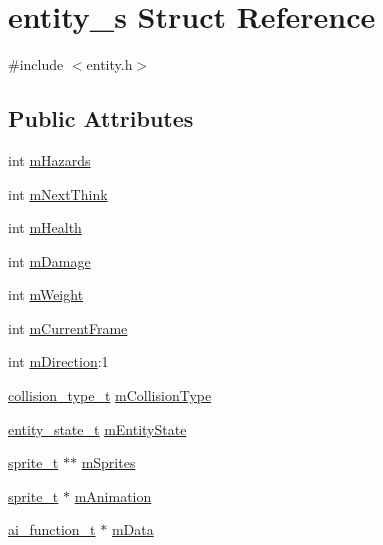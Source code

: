 \hypertarget{structentity__s}{}\section{entity\+\_\+s Struct Reference}
\label{structentity__s}


{\ttfamily \#include $<$entity.\+h$>$}

\subsection*{Public Attributes}
\begin{DoxyCompactItemize}
\item 
int \hyperlink{structentity__s_a85aba3f3deb7126edc63842086839c79}{m\+Hazards}
\item 
int \hyperlink{structentity__s_a760363fc97f98abe86919af5e1957745}{m\+Next\+Think}
\item 
int \hyperlink{structentity__s_a4526f4ec298fe048fb0394eb1eada6c2}{m\+Health}
\item 
int \hyperlink{structentity__s_aa0f5af86981e724016b355cf4848e0e7}{m\+Damage}
\item 
int \hyperlink{structentity__s_ac2067b7ab37cc1f70d5e8353755109fa}{m\+Weight}
\item 
int \hyperlink{structentity__s_ada34ca9a8b88e0f09d9db8d326f3a4be}{m\+Current\+Frame}
\item 
int \hyperlink{structentity__s_a1c2e6077665e194128d01c8789f76941}{m\+Direction}\+:1
\item 
\hyperlink{globals_8h_a09e75d7e17aa0fd73648231363dcc13a}{collision\+\_\+type\+\_\+t} \hyperlink{structentity__s_aff6d73a9efeac0929da697cde607a8bc}{m\+Collision\+Type}
\item 
\hyperlink{globals_8h_a99f3d33a52ee74fc145c14ceee9d4154}{entity\+\_\+state\+\_\+t} \hyperlink{structentity__s_a4636f280b32796ffb0d647e1ce72898e}{m\+Entity\+State}
\item 
\hyperlink{graphics_8h_a5371414b10358aeda7c6bcec8196342f}{sprite\+\_\+t} $\ast$$\ast$ \hyperlink{structentity__s_a559fa151dfaeab03a371853042d4b22f}{m\+Sprites}
\item 
\hyperlink{graphics_8h_a5371414b10358aeda7c6bcec8196342f}{sprite\+\_\+t} $\ast$ \hyperlink{structentity__s_ad464763e1aa713bd82f953fb139810c1}{m\+Animation}
\item 
\hyperlink{ai__interpret_8h_a93e23f66130135adeb83b13c29f36fca}{ai\+\_\+function\+\_\+t} $\ast$ \hyperlink{structentity__s_aea03c4a26a1e35735484318548c63db6}{m\+Data}
$$
\end{DoxyCompactItemize}
